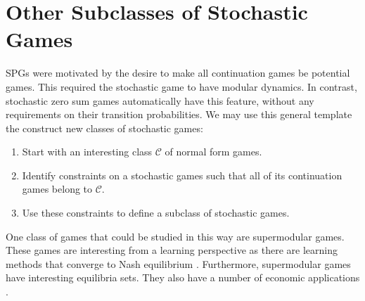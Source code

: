 \section{Other Subclasses of Stochastic Games}

SPGs were motivated by the desire to make all continuation games be potential games. This required the stochastic game to have modular dynamics. In contrast, stochastic zero sum games automatically have this feature, without any requirements on their transition probabilities. We may use this general template the construct new classes of stochastic games:

\begin{enumerate}
    \item Start with an interesting class $\mathcal{C}$ of normal form games. 
    \item Identify constraints on a stochastic games such that all of its continuation games belong to $\mathcal{C}$.
    \item Use these constraints to define a subclass of stochastic games.
\end{enumerate}

One class of games that could be studied in this way are supermodular games. These games are interesting from a learning perspective as there are learning methods that converge to Nash equilibrium \cite{hofbauer2002global}. Furthermore, supermodular games have interesting equilibria sets. They also have a number of economic applications \cite{topkis1979equilibrium, vives1990nash, milgrom1990rationalizability}.